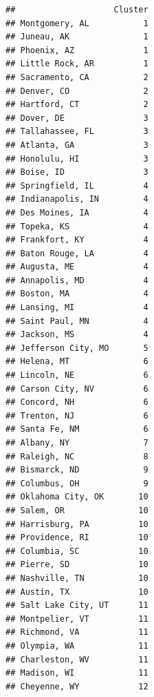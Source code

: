 \documentclass[
]{article}
\newenvironment{Shaded}{\begin{snugshade}}{\end{snugshade}}
\newcommand{\DataTypeTok}[1]{\textcolor[rgb]{0.13,0.29,0.53}{#1}}
\newcommand{\DecValTok}[1]{\textcolor[rgb]{0.00,0.00,0.81}{#1}}
\newcommand{\KeywordTok}[1]{\textcolor[rgb]{0.13,0.29,0.53}{\textbf{#1}}}
\newcommand{\NormalTok}[1]{#1}
\newcommand{\OperatorTok}[1]{\textcolor[rgb]{0.81,0.36,0.00}{\textbf{#1}}}
\newcommand{\StringTok}[1]{\textcolor[rgb]{0.31,0.60,0.02}{#1}}
\begin{document}
\begin{Shaded}
\end{Shaded}

\begin{verbatim}
##                    Cluster
## Montgomery, AL           1
## Juneau, AK               1
## Phoenix, AZ              1
## Little Rock, AR          1
## Sacramento, CA           2
## Denver, CO               2
## Hartford, CT             2
## Dover, DE                3
## Tallahassee, FL          3
## Atlanta, GA              3
## Honolulu, HI             3
## Boise, ID                3
## Springfield, IL          4
## Indianapolis, IN         4
## Des Moines, IA           4
## Topeka, KS               4
## Frankfort, KY            4
## Baton Rouge, LA          4
## Augusta, ME              4
## Annapolis, MD            4
## Boston, MA               4
## Lansing, MI              4
## Saint Paul, MN           4
## Jackson, MS              4
## Jefferson City, MO       5
## Helena, MT               6
## Lincoln, NE              6
## Carson City, NV          6
## Concord, NH              6
## Trenton, NJ              6
## Santa Fe, NM             6
## Albany, NY               7
## Raleigh, NC              8
## Bismarck, ND             9
## Columbus, OH             9
## Oklahoma City, OK       10
## Salem, OR               10
## Harrisburg, PA          10
## Providence, RI          10
## Columbia, SC            10
## Pierre, SD              10
## Nashville, TN           10
## Austin, TX              10
## Salt Lake City, UT      11
## Montpelier, VT          11
## Richmond, VA            11
## Olympia, WA             11
## Charleston, WV          11
## Madison, WI             11
## Cheyenne, WY            12
\end{verbatim}
\end{document}
